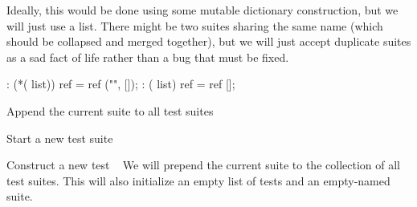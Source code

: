 Ideally, this would be done using some mutable dictionary construction,
but we will just use a list. There might be two suites sharing the same
name (which should be collapsed and merged together), but we will just
accept duplicate suites as a sad fact of life rather than a bug that
must be fixed.

\nwenddocs{}\endmoddef\nwstartdeflinemarkup{}\nwenddeflinemarkup
{}  : (*( list)) ref = ref ("", []);
  : ( list) ref = ref [];

\LA{}Append the current suite to all test suites~{\nwtagstyle{}}\RA{}
  
\LA{}Start a new test suite~{\nwtagstyle{}}\RA{}
  
\LA{}Construct a new test ~{\nwtagstyle{}}\RA{}
\eatline
{}\nwendcode{}\nwdocspar
We will prepend the current suite to the collection of all test
suites. This will also initialize an empty list of tests and an
empty-named suite.

